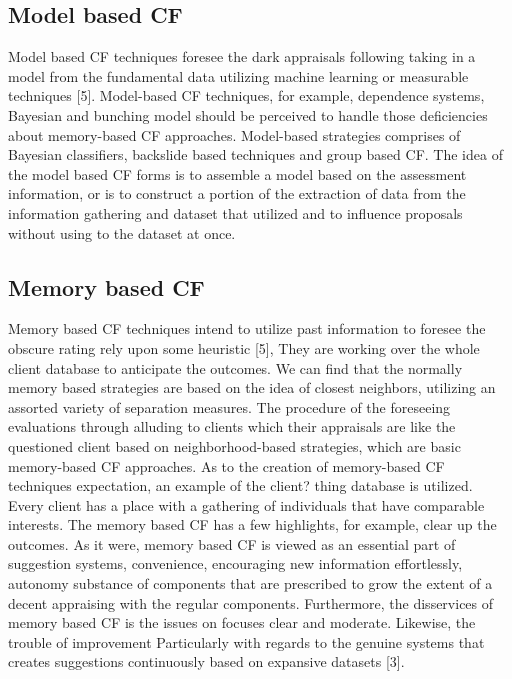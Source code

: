 \documentclass[10pt,conference]{IEEEtran}
\begin{document}
\subsection{Model based CF}
Model based CF techniques foresee the dark appraisals following taking in a model from the fundamental data utilizing machine learning or measurable techniques [5]. Model-based
CF techniques, for example, dependence systems, Bayesian and bunching model should be perceived to handle those deficiencies about memory-based CF approaches. Model-based strategies comprises of Bayesian classifiers, backslide based techniques and group based CF. The idea of the model based CF forms is to assemble a model based on the assessment information, or is to construct a portion of the extraction of data from the information gathering and dataset that utilized and to influence proposals without using to the dataset at once. 

\subsection{Memory based CF}
Memory based CF techniques intend to utilize past information to foresee the obscure rating rely upon some heuristic [5], They are working over the whole client database to anticipate the outcomes. We can find that the normally memory based strategies are based on the idea of closest neighbors, utilizing an assorted variety of separation measures. The procedure of the foreseeing evaluations through alluding to clients which their appraisals are like the questioned client based on neighborhood-based strategies, which are basic memory-based CF approaches. As to the creation of memory-based CF techniques expectation, an example of the client? thing database is utilized. Every client has a place with a gathering of individuals that have comparable interests. The memory based CF has a few highlights, for example, clear up the outcomes. As it were, memory based CF is viewed as an essential part of suggestion systems, convenience, encouraging new information effortlessly, autonomy substance of components that are prescribed to grow the extent of a decent appraising with the regular components. Furthermore, the disservices of memory based CF is the issues on focuses clear and moderate. Likewise, the trouble of improvement Particularly with regards to the genuine systems that creates suggestions continuously based on expansive datasets [3]. 
\end{document}
